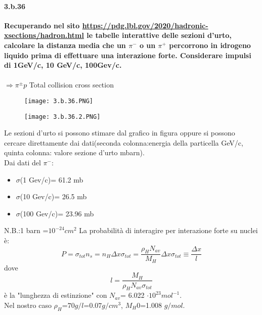 \documentclass[twoside]{article}
\begin{document}
\paragraph{3.b.36}\textbf{Recuperando nel sito \url{https://pdg.lbl.gov/2020/hadronic-xsections/hadron.html} le
tabelle interattive delle sezioni d'urto, calcolare la distanza media che un $\pi^-$ o un $\pi^+$ percorrono in idrogeno liquido prima di effettuare una interazione
forte. Considerare impulsi di 1GeV/c, 10 GeV/c, 100Gev/c.}\\
\\
$\Rightarrow \pi^{\pm}p$ Total collision cross section
\begin{figure}[H]
    \centering
    \texttt{[image: 3.b.36.PNG]}
\end{figure}
\begin{figure}[H]
    \centering
    \texttt{[image: 3.b.36.2.PNG]}
\end{figure}
Le sezioni d'urto si possono stimare dal grafico in figura oppure si possono cercare direttamente dai dati(seconda colonna:energia della particella GeV/c, quinta colonna: valore sezione d'urto mbarn).\\
Dai dati del $\pi^-$:
\begin{itemize}
    \item $\sigma$(1 Gev/c)= 61.2 mb
    \item $\sigma$(10 Gev/c)= 26.5 mb
    \item $\sigma$(100 Gev/c)= 23.96 mb
\end{itemize}
N.B.:1 barn =$10^{-24} cm^2$
La probabilità di interagire per interazione forte su nuclei è:
\begin{equation*}
    P=\sigma_{tot} n_s= n_H \Delta x
    \sigma_{tot}=\frac{\rho_H N_{av}}{M_H} \Delta x \sigma_{tot}\equiv \frac{\Delta x}{l}
\end{equation*}
dove 
\begin{equation*}
    l=\frac{M_H}{\rho_H N_{av} \sigma_{tot}}
\end{equation*}
è la "lunghezza di estinzione" con $N_{av}$= 6.022 $\cdot 10^{23} mol^{-1}$.\\
Nel nostro caso  $\rho_H$=$70 g/l$=$0.07 g/cm^3$, $M_H0$=1.008 $g/mol$.
\end{document}
